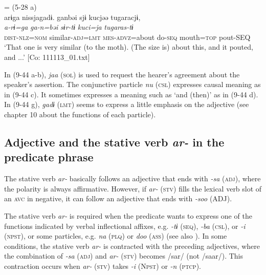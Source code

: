 \ex{} = (5-28 a)\\
    \glll  arɨga  nissjagadɨ.  ganbəi  sjɨ  kucjəə  tugaracjɨ,\\
      \textit{a-rɨ=ga}  \textit{}  \textit{ga-n=bəi}  \textit{sɨr-tɨ}   \textit{kuci=ja}  \textit{tugaras-tɨ}\\
      \textsc{dist}-\textsc{nlz}=\textsc{nom}  similar-\textsc{adj}=\textsc{lmt}  \textsc{mes}-\textsc{advz}=about  do-\textsc{seq}  mouth=\textsc{top}  pout-SEQ      \\
      \glt       ‘That one is very similar (to the moth). (The size is) about this, and it pouted, and ...’ [Co: 111113\_01.txt]
    \z
\z

In (9-44 a-b), \textit{jaa} (\textsc{sol}) is used to request the hearer’s agreement about the speaker’s assertion. The conjunctive particle \textit{nu} (\textsc{csl}) expresses causal meaning as in (9-44 c). It sometimes expresses a meaning such as ‘and (then)’ as in (9-44 d). In (9-44 g), \textit{gadɨ} (\textsc{lmt}) seems to express a little emphasis on the adjective (see chapter 10 about the functions of each particle).

\subsection{Adjective and the stative verb \textit{ar-} in the predicate phrase}\label{sec:9.2.2}

The stative verb \textit{ar-} basically follows an adjective that ends with \textit{{}-sa} (\textsc{adj}), where the polarity is always affirmative. However, if \textit{ar-} (\textsc{stv}) fills the lexical verb slot of an \textsc{avc} in negative, it can follow an adjective that ends with \textit{{}-soo} (ADJ).

The stative verb \textit{ar-} is required when the predicate wants to express one of the functions indicated by verbal inflectional affixes, e.g. \textit{{}-tɨ} (\textsc{seq}), \textit{{}-ba} (\textsc{csl}), or \textit{-i} (\textsc{npst}), or some particles, e.g. \textit{na} (\textsc{plq}) or \textit{doo} (\textsc{ass}) (see also ). In some conditions, the stative verb \textit{ar-} is contracted with the preceding adjectives, where the combination of \textit{{}-sa} (\textsc{adj}) and \textit{ar-} (\textsc{stv}) becomes /sar/ (not /saar/). This contraction occurs when \textit{ar-} (\textsc{stv}) takes \textit{{}-i} (N\textsc{pst}) or \textit{{}-n} (\textsc{ptcp}).


